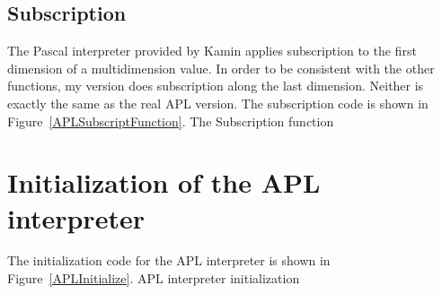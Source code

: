 \subsection{Subscription}

The Pascal interpreter provided by Kamin applies subscription to the first
dimension of a multidimension value.  In order to be consistent with the other
functions, my version does subscription along the last dimension.  Neither is
exactly the same as the real APL version.  The subscription code is shown in
Figure~\ref{APLSubscriptFunction}.
%
{The Subscription function}

\section{Initialization of the APL interpreter}

The initialization code for the APL interpreter is shown in
Figure~\ref{APLInitialize}.
%
{APL interpreter initialization}
